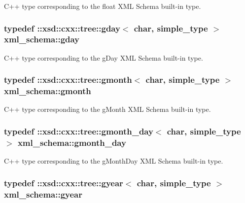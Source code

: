 C++ type corresponding to the float X\-M\-L Schema built-\/in type. 

\hypertarget{namespacexml__schema_a4beba84e7d1a15ea569cad2c7cc2247a}{
\subsubsection[{gday}]{\setlength{\rightskip}{0pt plus 5cm}typedef \-::xsd\-::cxx\-::tree\-::gday$<$ char, {\bf simple\-\_\-type} $>$ {\bf xml\-\_\-schema\-::gday}}}\label{namespacexml__schema_a4beba84e7d1a15ea569cad2c7cc2247a}


C++ type corresponding to the g\-Day X\-M\-L Schema built-\/in type. 

\hypertarget{namespacexml__schema_a1ab06e26cf2c2f3ad971f63c143afd7f}{
\subsubsection[{gmonth}]{\setlength{\rightskip}{0pt plus 5cm}typedef \-::xsd\-::cxx\-::tree\-::gmonth$<$ char, {\bf simple\-\_\-type} $>$ {\bf xml\-\_\-schema\-::gmonth}}}\label{namespacexml__schema_a1ab06e26cf2c2f3ad971f63c143afd7f}


C++ type corresponding to the g\-Month X\-M\-L Schema built-\/in type. 

\hypertarget{namespacexml__schema_aa97adeeeffe50dd9b596b12006c56953}{
\subsubsection[{gmonth\-\_\-day}]{\setlength{\rightskip}{0pt plus 5cm}typedef \-::xsd\-::cxx\-::tree\-::gmonth\-\_\-day$<$ char, {\bf simple\-\_\-type} $>$ {\bf xml\-\_\-schema\-::gmonth\-\_\-day}}}\label{namespacexml__schema_aa97adeeeffe50dd9b596b12006c56953}


C++ type corresponding to the g\-Month\-Day X\-M\-L Schema built-\/in type. 

\hypertarget{namespacexml__schema_ab0d28a4409143544c8f43bbcc1edeac2}{
\subsubsection[{gyear}]{\setlength{\rightskip}{0pt plus 5cm}typedef \-::xsd\-::cxx\-::tree\-::gyear$<$ char, {\bf simple\-\_\-type} $>$ {\bf xml\-\_\-schema\-::gyear}}}\label{namespacexml__schema_ab0d28a4409143544c8f43bbcc1edeac2}


